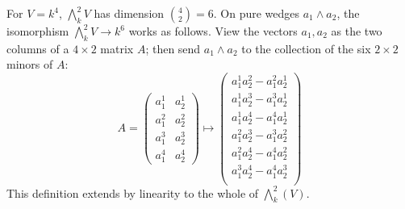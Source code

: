 \begin{example}
For $V=k^4$, $\bigwedge^2_kV$ has dimension $\binom{4}{2}=6$. On pure wedges $a_1\wedge a_2$, the isomorphism $\bigwedge^2_kV\to k^6$ works as follows. View the vectors $a_1,a_2$ as the two
columns of a $4\times2$ matrix $A$; then send $a_1\wedge a_2$ to the collection of the six $2\times 2$ minors of $A$:
\[A=\begin{pmatrix}
a^1_1&a^1_2\\
a^2_1&a^2_2\\
a^3_1&a^3_2\\
a^4_1&a^4_2
\end{pmatrix}\mapsto
\begin{pmatrix}
a^1_1a^2_2-a^2_1a^1_2\\
a^1_1a^3_2-a^3_1a^1_2\\
a^1_1a^4_2-a^4_1a^1_2\\
a^2_1a^3_2-a^3_1a^2_2\\
a^2_1a^4_2-a^4_1a^2_2\\
a^3_1a^4_2-a^4_1a^3_2\\
\end{pmatrix}\]
This definition extends by linearity to the whole of $\bigwedge^2_k(V)$.
\end{example}
